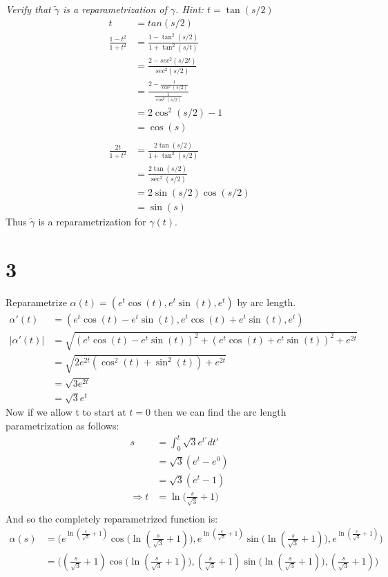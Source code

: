 \documentclass[a4paper, 11pt]{article}
\begin{document}
 \textit{Verify that $\tilde{\gamma}$ is a reparametrization of $\gamma$. Hint: $t = \tan(s/2)$}
	\begin{align*}
		t &= tan(s/2) \\ 
		\frac{1-t^2}{1+t^2} &= \frac{1-\tan^2(s/2)}{1+\tan^2(s/t)}\\
			&= \frac{2-sec^2(s/2t)}{sec^2(s/2)} \\ 
			&= \frac{2-\frac{1}{\cos^2(s/2)}}{\frac{1}{\cos^2(s/2)}} \\
			&= 2\cos^2(s/2)-1 \\ 
			&= \cos(s) \\ \\ 
		\frac{2t}{1+t^2} &= \frac{2\tan(s/2)}{1+\tan^2(s/2)} \\
			&= \frac{2\tan(s/2)}{\sec^2(s/2)} \\ 
			&= 2\sin(s/2)\cos(s/2)\\ 
			&= \sin(s) 
	\end{align*}
Thus $\tilde{\gamma}$ is a reparametrization for $\gamma(t)$. 

\section*{3}
Reparametrize $\alpha(t) = (e^t\cos(t), e^t\sin(t), e^t)$ by arc length. 
	\begin{align*}
		\alpha'(t) &= (e^t\cos(t)-e^t\sin(t), e^t\cos(t)+e^t\sin(t), e^t)\\
		|\alpha'(t)| &= \sqrt{(e^t\cos(t)-e^t\sin(t))^2+(e^t\cos(t)+e^t\sin(t))^2+e^{2t}}\\ 
			&= \sqrt{2e^{2t}(\cos^2(t)+\sin^2(t))+e^{2t}} \\ 
			&= \sqrt{3e^{2t}}\\ 
			&= \sqrt{3}e^t
	\end{align*}
Now if we allow t to start at $t=0$ then we can find the arc length parametrization as follows: 
	\begin{align*}
		s 	&= \int_0^t \sqrt{3}e^{t'} dt' \\ 
			&= \sqrt{3}(e^t-e^0) \\ 
			&= \sqrt{3}(e^t-1)\\
		\Rightarrow t &= \ln\Big(\frac{s}{\sqrt{3}}+1\Big)\\ 
	\end{align*}
And so the completely reparametrized function is:
	\begin{align*}
		\alpha(s) &= \Big(e^{\ln(\frac{s}{\sqrt{3}}+1)}\cos\Big(\ln(\frac{s}{\sqrt{3}}+1) \Big), e^{\ln(\frac{s}{\sqrt{3}}+1)}\sin\Big(\ln(\frac{s}{\sqrt{3}}+1) \Big), e^{\ln(\frac{s}{\sqrt{3}}+1)}\Big)\\
		&= \Big( (\frac{s}{\sqrt{3}}+1)\cos\Big(\ln(\frac{s}{\sqrt{3}}+1) \Big), (\frac{s}{\sqrt{3}}+1)\sin\Big(\ln(\frac{s}{\sqrt{3}}+1) \Big), (\frac{s}{\sqrt{3}}+1)\Big)
	\end{align*}
\end{document}
